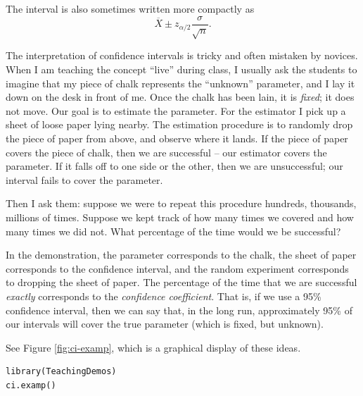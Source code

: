 \documentclass[captions=tableheading]{scrbook}
\begin{document}
\begin{rem}
The interval is also sometimes written more compactly as
\begin{equation}
\overline{X}\pm z_{\alpha/2}\frac{\sigma}{\sqrt{n}}.\label{eq:z-interval}
\end{equation}
\end{rem}

The interpretation of confidence intervals is tricky and often mistaken by novices. When I am teaching the concept ``live'' during class, I usually ask the students to imagine that my piece of chalk represents the ``unknown'' parameter, and I lay it down on the desk in front of me. Once the chalk has been lain, it is \emph{fixed}; it does not move. Our goal is to estimate the parameter. For the estimator I pick up a sheet of loose paper lying nearby. The estimation procedure is to randomly drop the piece of paper from above, and observe where it lands. If the piece of paper covers the piece of chalk, then we are successful -- our estimator covers the parameter. If it falls off to one side or the other, then we are unsuccessful; our interval fails to cover the parameter.

Then I ask them: suppose we were to repeat this procedure hundreds, thousands, millions of times. Suppose we kept track of how many times we covered and how many times we did not. What percentage of the time would we be successful?

In the demonstration, the parameter corresponds to the chalk, the sheet of paper corresponds to the confidence interval, and the random experiment corresponds to dropping the sheet of paper. The percentage of the time that we are successful \emph{exactly} corresponds to the \emph{confidence coefficient}. That is, if we use a 95\% confidence interval, then we can say that, in the long run, approximately 95\% of our intervals will cover the true parameter (which is fixed, but unknown). 

See Figure \ref{fig:ci-examp}, which is a graphical display of these ideas.



\begin{verbatim}
library(TeachingDemos)
ci.examp()
\end{verbatim}
\end{document}
